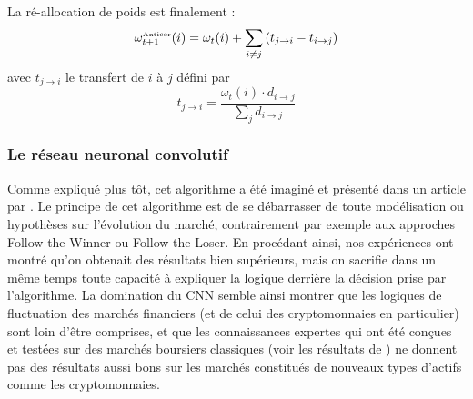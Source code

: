 \documentclass[a4paper, 10pt]{article}
\begin{document}
La ré-allocation de poids est finalement :
\begin{equation}
    \omega_{t+1}^{\text{\tiny Anticor}}(i) = \omega_{t}(i) + \sum_{i \ne j} \left(t_{j\rightarrow i} - t_{i\rightarrow j} \right)
\end{equation}
avec $t_{j\rightarrow i}$ le transfert de $i$ à $j$ défini par
\begin{equation}
    t_{j\rightarrow i} = \frac{\omega_{t}(i) \cdot d_{i\rightarrow j}}{\sum_{j} d_{i\rightarrow j}}
\end{equation}

\subsubsection{Le réseau neuronal convolutif}
\label{sec:theorie_etude_cnn}

Comme expliqué plus tôt, cet algorithme a été imaginé et présenté dans un article par \citet{Jiang2017}. Le principe de cet algorithme est de se débarrasser de toute modélisation ou hypothèses sur l'évolution du marché, contrairement par exemple aux approches Follow-the-Winner ou Follow-the-Loser. En procédant ainsi, nos expériences ont montré qu'on obtenait des résultats bien supérieurs, mais on sacrifie dans un même temps toute capacité à expliquer la logique derrière la décision prise par l'algorithme. La domination du CNN semble ainsi montrer que les logiques de fluctuation des marchés financiers (et de celui des cryptomonnaies en particulier) sont loin d'être comprises, et que les connaissances expertes qui ont été conçues et testées sur des marchés boursiers classiques (voir les résultats de \cite{Li2014}) ne donnent pas des résultats aussi bons sur les marchés constitués de nouveaux types d'actifs comme les cryptomonnaies.
\end{document}
